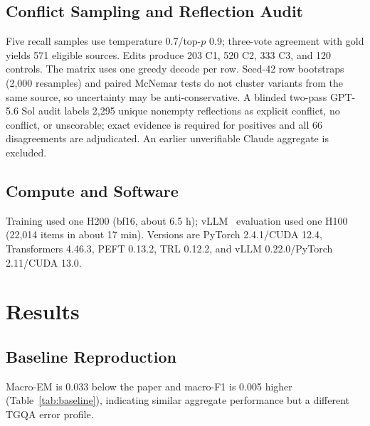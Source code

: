 \documentclass[conference]{IEEEtran}
\begin{document}
\subsection{Conflict Sampling and Reflection Audit}

Five recall samples use temperature 0.7/top-$p$ 0.9; three-vote agreement with gold yields 571 eligible sources. Edits produce 203 C1, 520 C2, 333 C3, and 120 controls. The matrix uses one greedy decode per row. Seed-42 row bootstraps (2,000 resamples) and paired McNemar tests do not cluster variants from the same source, so uncertainty may be anti-conservative. A blinded two-pass GPT-5.6 Sol audit labels 2,295 unique nonempty reflections as explicit conflict, no conflict, or unscorable; exact evidence is required for positives and all 66 disagreements are adjudicated. An earlier unverifiable Claude aggregate is excluded.

\subsection{Compute and Software}

Training used one H200 (bf16, about 6.5 h); vLLM~\cite{kwon2023vllm} evaluation used one H100 (22,014 items in about 17 min). Versions are PyTorch 2.4.1/CUDA 12.4, Transformers 4.46.3, PEFT 0.13.2, TRL 0.12.2, and vLLM 0.22.0/PyTorch 2.11/CUDA 13.0.

\section{Results}

\subsection{Baseline Reproduction}

Macro-EM is 0.033 below the paper and macro-F1 is 0.005 higher (Table~\ref{tab:baseline}), indicating similar aggregate performance but a different TGQA error profile.
\end{document}
